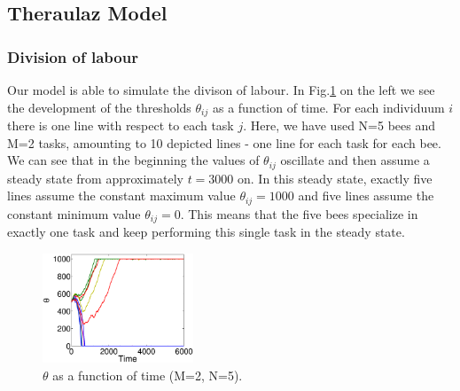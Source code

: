 
\subsection{Theraulaz Model}
\subsubsection*{Division of labour}
Our model is able to simulate the divison of labour. In Fig.\ref{fig:thetax} on the left we see the development of the thresholds $\theta_{ij}$ as a function of time. For each individuum $i$ there is one line with respect to each task $j$. Here, we have used N=5 bees and M=2 tasks, amounting to 10 depicted lines - one line for each task for each bee. We can see that in the beginning the values of $\theta_{ij}$ oscillate and then assume a steady state from approximately $t=3000$ on. In this steady state, exactly five lines assume the constant maximum value $\theta_{ij}=1000$ and five lines assume the constant minimum value $\theta_{ij}=0$. This means that the five bees specialize in exactly one task and keep performing this single task in the steady state.

\begin{figure}[ht!]
	\centering
	\includegraphics[width=0.4\textwidth]{figures/thetax.eps}
	\caption{$\theta$ as a function of time (M=2, N=5).}
	\label{fig:thetax}
\end{figure}

